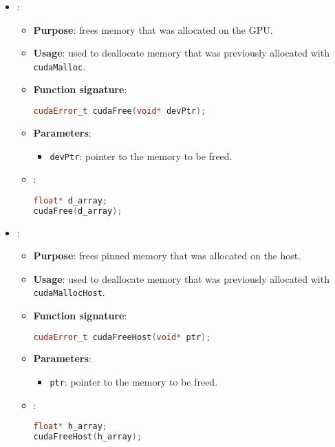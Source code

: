 \begin{itemize}
    \item {}:
    \begin{itemize}
        \item \textbf{Purpose}: frees memory that was allocated on the GPU.
        \item \textbf{Usage}: used to deallocate memory that was previously allocated with \texttt{cudaMalloc}.
        \item \textbf{Function signature}:
        \begin{lstlisting}[language=C++]
cudaError_t cudaFree(void* devPtr);\end{lstlisting}
        \item \textbf{Parameters}:
        \begin{itemize}
            \item \texttt{devPtr}: pointer to the memory to be freed.
        \end{itemize}
        \item {}:
        \begin{lstlisting}[language=C++]
float* d_array;
cudaFree(d_array);\end{lstlisting}
    \end{itemize}

    \item {}:
    \begin{itemize}
        \item \textbf{Purpose}: frees pinned memory that was allocated on the host.
        \item \textbf{Usage}: used to deallocate memory that was previously allocated with \texttt{cudaMallocHost}.
        \item \textbf{Function signature}:
        \begin{lstlisting}[language=C++]
cudaError_t cudaFreeHost(void* ptr);\end{lstlisting}
        \item \textbf{Parameters}:
        \begin{itemize}
            \item \texttt{ptr}: pointer to the memory to be freed.
        \end{itemize}
        \item {}:
        \begin{lstlisting}[language=C++]
float* h_array;
cudaFreeHost(h_array);\end{lstlisting}
    \end{itemize}


\end{itemize}
